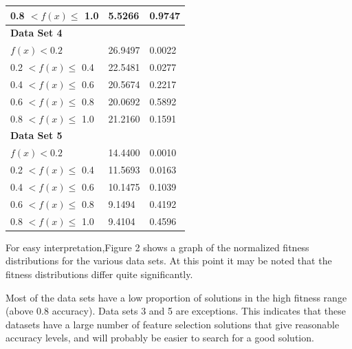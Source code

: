 \documentclass[journal,comsoc]{IEEEtran}
\begin{document}
\begin{table}[H]
\begin{tabular}{lll}
\multicolumn{1}{|l|}{0.8 $ < f(x) \leq $ 1.0} & \multicolumn{1}{l|}{5.5266} & \multicolumn{1}{l|}{0.9747} \\ \hline
\textbf{Data Set 4} &  &  \\ \hline
\multicolumn{1}{|l|}{$f(x) < 0.2$} & \multicolumn{1}{l|}{26.9497} & \multicolumn{1}{l|}{0.0022} \\ \hline
\multicolumn{1}{|l|}{0.2 $ < f(x) \leq $ 0.4} & \multicolumn{1}{l|}{22.5481} & \multicolumn{1}{l|}{0.0277} \\ \hline
\multicolumn{1}{|l|}{0.4 $ < f(x) \leq $ 0.6} & \multicolumn{1}{l|}{20.5674} & \multicolumn{1}{l|}{0.2217} \\ \hline
\multicolumn{1}{|l|}{0.6 $ < f(x) \leq $ 0.8} & \multicolumn{1}{l|}{20.0692} & \multicolumn{1}{l|}{0.5892} \\ \hline
\multicolumn{1}{|l|}{0.8 $ < f(x) \leq $ 1.0} & \multicolumn{1}{l|}{21.2160} & \multicolumn{1}{l|}{0.1591} \\ \hline
\textbf{Data Set 5} &  &  \\ \hline
\multicolumn{1}{|l|}{$f(x) < 0.2$} & \multicolumn{1}{l|}{14.4400} & \multicolumn{1}{l|}{0.0010} \\ \hline
\multicolumn{1}{|l|}{0.2 $ < f(x) \leq $ 0.4} & \multicolumn{1}{l|}{11.5693} & \multicolumn{1}{l|}{0.0163} \\ \hline
\multicolumn{1}{|l|}{0.4 $ < f(x) \leq $ 0.6} & \multicolumn{1}{l|}{10.1475} & \multicolumn{1}{l|}{0.1039} \\ \hline
\multicolumn{1}{|l|}{0.6 $ < f(x) \leq $ 0.8} & \multicolumn{1}{l|}{9.1494} & \multicolumn{1}{l|}{0.4192} \\ \hline
\multicolumn{1}{|l|}{0.8 $ < f(x) \leq $ 1.0} & \multicolumn{1}{l|}{9.4104} & \multicolumn{1}{l|}{0.4596} \\ \hline
\end{tabular}
\end{table}

For easy interpretation,Figure 2 shows a graph of the normalized fitness distributions for the various data sets. At this point it may be noted that the fitness distributions differ quite significantly.

Most of the data sets have a low proportion of solutions in the high fitness range (above 0.8 accuracy). Data sets 3 and 5 are exceptions. This indicates that these datasets have a large number of feature selection solutions that give reasonable accuracy levels, and will probably be easier to search for a good solution.
\end{document}
